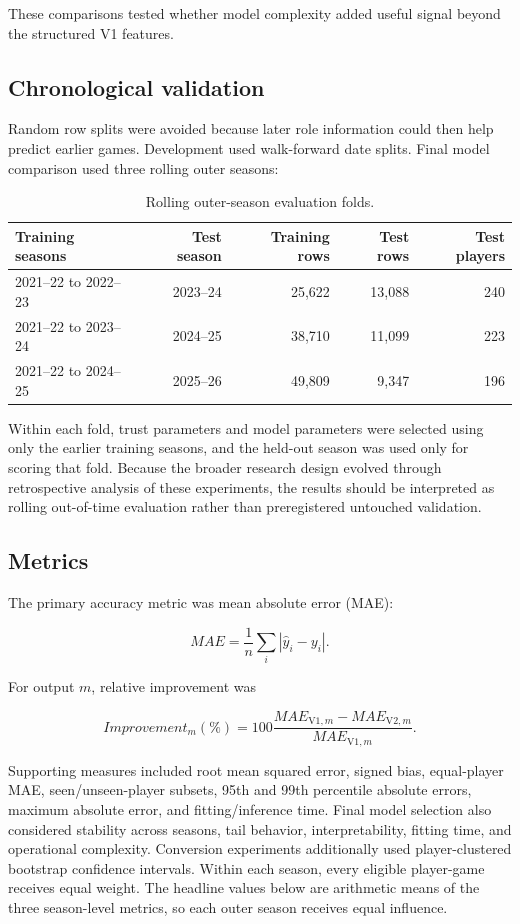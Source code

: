 \documentclass[11pt]{article}
\newcommand{\Vone}{\mathrm{V1}}
\newcommand{\Vtwo}{\mathrm{V2}}
\begin{document}
These comparisons tested whether model complexity added useful signal beyond
the structured V1 features.

\subsection{Chronological validation}

Random row splits were avoided because later role information could then help
predict earlier games. Development used walk-forward date splits. Final model
comparison used three rolling outer seasons:

\begin{table}[H]
\centering
\caption{Rolling outer-season evaluation folds.}
\label{tab:outer-folds}
\small
\begin{tabular}{lrrrr}
\toprule
Training seasons & Test season & Training rows & Test rows & Test players \\
\midrule
2021--22 to 2022--23 & 2023--24 & 25,622 & 13,088 & 240 \\
2021--22 to 2023--24 & 2024--25 & 38,710 & 11,099 & 223 \\
2021--22 to 2024--25 & 2025--26 & 49,809 & 9,347 & 196 \\
\bottomrule
\end{tabular}
\end{table}

Within each fold, trust parameters and model parameters were selected using
only the earlier training seasons, and the held-out season was used only for
scoring that fold. Because the broader research design evolved through
retrospective analysis of these experiments, the results should be interpreted
as rolling out-of-time evaluation rather than preregistered untouched
validation.

\subsection{Metrics}

The primary accuracy metric was mean absolute error (MAE):

\[
MAE=\frac{1}{n}\sum_i|\widehat{y}_i-y_i|.
\]

For output $m$, relative improvement was

\[
Improvement_m(\%)=
100\frac{MAE_{\Vone,m}-MAE_{\Vtwo,m}}{MAE_{\Vone,m}}.
\]

Supporting measures included root mean squared error, signed bias,
equal-player MAE, seen/unseen-player subsets, 95th and 99th percentile absolute
errors, maximum absolute error, and fitting/inference time. Final model
selection also considered stability across seasons, tail behavior,
interpretability, fitting time, and operational complexity. Conversion
experiments additionally used player-clustered bootstrap confidence intervals.
Within each season, every eligible player-game receives equal weight. The
headline values below are arithmetic means of the three season-level metrics,
so each outer season receives equal influence.
\end{document}
